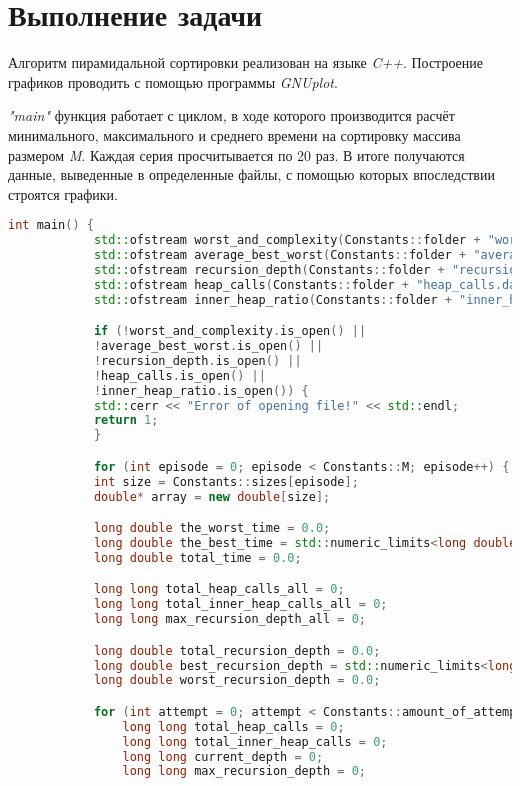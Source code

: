 \documentclass[12pt, a4paper]{report}
\begin{document}
	\section*{Выполнение задачи}
	Алгоритм пирамидальной сортировки реализован на языке \textit{C++}. Построение графиков проводить с помощью программы \textit{GNUplot}.

	\textit{"main"} функция работает с циклом, в ходе которого производится расчёт минимального, максимального и среднего времени на сортировку массива размером \textit{M}. Каждая серия просчитывается по 20 раз. В итоге получаются данные, выведенные в определенные файлы, с помощью которых впоследствии строятся графики.
	\lstset{style=mystyle}
	\begin{lstlisting}[language=C++]
		int main() {
		    std::ofstream worst_and_complexity(Constants::folder + "worst_and_complexity.dat");
		    std::ofstream average_best_worst(Constants::folder + "average_best_worst.dat");
		    std::ofstream recursion_depth(Constants::folder + "recursion_depth.dat");
		    std::ofstream heap_calls(Constants::folder + "heap_calls.dat");
		    std::ofstream inner_heap_ratio(Constants::folder + "inner_heap_ratio.dat");

		    if (!worst_and_complexity.is_open() ||
			!average_best_worst.is_open() ||
			!recursion_depth.is_open() ||
			!heap_calls.is_open() ||
			!inner_heap_ratio.is_open()) {
			std::cerr << "Error of opening file!" << std::endl;
			return 1;
		    }

		    for (int episode = 0; episode < Constants::M; episode++) {
			int size = Constants::sizes[episode];
			double* array = new double[size];

			long double the_worst_time = 0.0;
			long double the_best_time = std::numeric_limits<long double>::max();
			long double total_time = 0.0;

			long long total_heap_calls_all = 0;
			long long total_inner_heap_calls_all = 0;
			long long max_recursion_depth_all = 0;

			long double total_recursion_depth = 0.0;
			long double best_recursion_depth = std::numeric_limits<long double>::max();
			long double worst_recursion_depth = 0.0;

			for (int attempt = 0; attempt < Constants::amount_of_attempts; attempt++) {
			    long long total_heap_calls = 0;
			    long long total_inner_heap_calls = 0;
			    long long current_depth = 0;
			    long long max_recursion_depth = 0;


\end{lstlisting}
\end{document}
